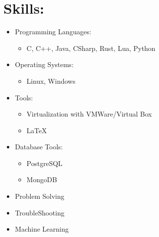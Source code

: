 \documentclass[12pt, oneside, a4paper]{article}
\begin{document}
    \section*{Skills:}
    \begin{itemize}
    \scriptsize
    \item Programming Languages:
        \begin{itemize}
            \item C, C++, Java, CSharp, Rust, Lua, Python
        \end{itemize}
    \item Operating Systems:
        \begin{itemize}
            \item Linux, Windows
        \end{itemize}
    \item Tools:
        \begin{itemize}
            \item Virtualization with VMWare/Virtual Box
            \item LaTeX
        \end{itemize}
    \item Database Tools:
        \begin{itemize}
            \item PostgreSQL
            \item MongoDB
        \end{itemize}
    \item Problem Solving
    \item TroubleShooting
    \item Machine Learning

    \end{itemize}
\end{document}
